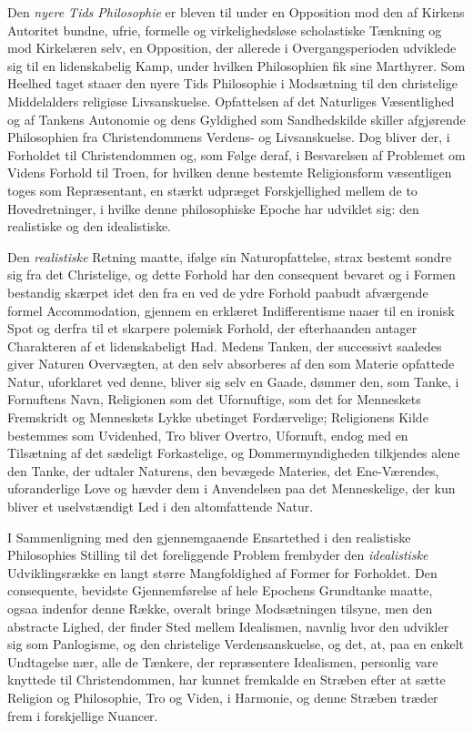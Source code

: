 \documentclass[12pt,a4paper]{book}
\newcommand{\opage}[1]{\marginnote{\footnotesize\textit{[#1]}}}
\begin{document}
Den \emph{nyere Tids Philosophie} er bleven til under en Opposition mod den af Kirkens
Autoritet bundne, ufrie, formelle og virkelighedsløse scholastiske Tænkning og
mod Kirkelæren selv, en Opposition, der allerede i Overgangsperioden udviklede
sig til en lidenskabelig Kamp, under hvilken Philosophien fik sine Marthyrer. Som
Heelhed \opage{22}taget staaer den nyere Tids Philosophie i Modsætning til den christelige
Middelalders religiøse Livsanskuelse. Opfattelsen af det Naturliges Væsentlighed
og af Tankens Autonomie og dens Gyldighed som Sandhedskilde skiller afgjørende
Philosophien fra Christendommens Verdens- og Livsanskuelse. Dog bliver der, i
Forholdet til Christendommen og, som Følge deraf, i Besvarelsen af Problemet om
Videns Forhold til Troen, for hvilken denne bestemte Religionsform væsentligen
toges som Repræsentant, en stærkt udpræget Forskjellighed mellem de to
Hovedretninger, i hvilke denne philosophiske Epoche har udviklet sig: den
realistiske og den idealistiske.

Den \emph{realistiske} Retning maatte, ifølge sin Naturopfattelse, strax bestemt sondre
sig fra det Christelige, og dette Forhold har den consequent bevaret og i Formen
bestandig skærpet idet den fra en ved de ydre Forhold paabudt afværgende formel
Accommodation, gjennem en erklæret Indifferentisme naaer til en ironisk Spot og
derfra til et skarpere polemisk Forhold, der efterhaanden antager Charakteren af
et lidenskabeligt Had. Medens Tanken, der successivt saaledes giver Naturen
Overvægten, at den selv absorberes af den som Materie opfattede Natur, uforklaret
ved denne, bliver sig selv en Gaade, dømmer den, som Tanke, i Fornuftens Navn,
Religionen som det Ufornuftige, som det for Menneskets Fremskridt og Menneskets
Lykke ubetinget Fordærvelige; Religionens Kilde bestemmes som Uvidenhed, Tro
bliver Overtro, Ufornuft, endog med en Tilsætning af det sædeligt Forkastelige,
og Dommermyndigheden tilkjendes alene den Tanke, der udtaler Naturens, den
bevægede Materies, det Ene-Værendes, uforanderlige Love og hævder dem i
Anvendelsen paa det Menneskelige, der kun bliver et uselvstændigt Led i den
altomfattende Natur.

I Sammenligning med den gjennemgaaende Ensartethed i den realistiske Philosophies
Stilling til det foreliggende Problem frembyder den \emph{idealistiske} Udviklingsrække
en langt større Mangfoldighed af Former for Forholdet. Den consequente, bevidste
Gjennemførelse af hele Epochens \opage{23}Grundtanke maatte, ogsaa indenfor denne Række,
overalt bringe Modsætningen tilsyne, men den abstracte Lighed, der finder Sted
mellem Idealismen, navnlig hvor den udvikler sig som Panlogisme, og den
christelige Verdensanskuelse, og det, at, paa en enkelt Undtagelse nær, alle de
Tænkere, der repræsentere Idealismen, personlig vare knyttede til Christendommen,
har kunnet fremkalde en Stræben efter at sætte Religion og Philosophie, Tro og
Viden, i Harmonie, og denne Stræben træder frem i forskjellige Nuancer.
\end{document}
